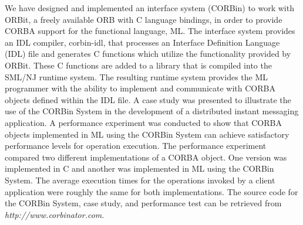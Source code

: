 
We have designed and implemented an interface system (CORBin) 
to work with ORBit, a freely available ORB with C language 
bindings, in order to provide CORBA support for the functional 
language, ML. The interface system provides an IDL compiler, 
corbin-idl, that processes an Interface Definition Language 
(IDL) file and generates C functions which utilize the 
functionality provided by ORBit.  These C functions are 
added to a library that is compiled into the SML/NJ runtime 
system.  The resulting runtime system provides the ML programmer 
with the ability to implement and communicate with CORBA objects 
defined within the IDL file.  A case study was presented to 
illustrate the use of the CORBin System in the development of 
a distributed instant messaging application.   A performance
experiment was conducted to show that CORBA objects implemented
in ML using the CORBin System can achieve satisfactory performance
levels for operation execution.   The performance experiment compared
two different implementations of a CORBA object.  One version was 
implemented in C and another was implemented in ML using the CORBin
System.  The average execution times for the operations 
invoked by a client application were roughly the same for both 
implementations.  The source code for the CORBin System,
case study,  and performance test can be retrieved from
{\em{http://www.corbinator.com}}.  


